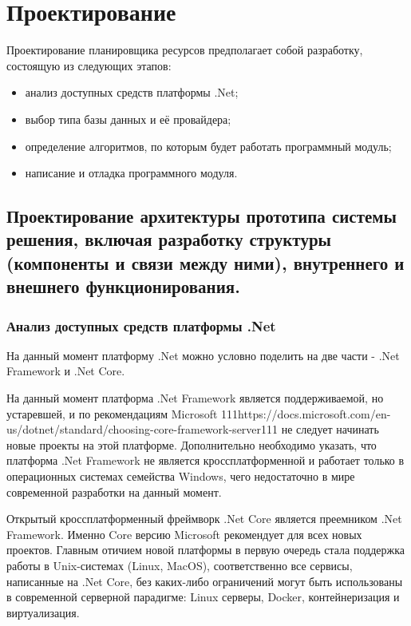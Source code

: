 \section{Проектирование}

Проектирование планировщика ресурсов предполагает собой разработку, состоящую из следующих этапов:
\begin{itemize}
	\item анализ доступных средств платформы .Net;
	\item выбор типа базы данных и её провайдера;
	\item определение алгоритмов, по которым будет работать программный модуль;
	\item написание и отладка программного модуля.
\end{itemize}


\subsection{Проектирование архитектуры прототипа системы решения, включая разработку структуры (компоненты и связи между ними), внутреннего и внешнего функционирования.}

\subsubsection{Анализ доступных средств платформы .Net}

На данный момент платформу .Net можно условно поделить на две части - .Net Framework и .Net Core.

На данный момент платформа .Net Framework является поддерживаемой, но устаревшей, и по рекомендациям Microsoft 111https://docs.microsoft.com/en-us/dotnet/standard/choosing-core-framework-server111 не следует начинать новые проекты на этой платформе. Дополнительно необходимо указать, что платформа .Net Framework не является кроссплатформенной и работает только в операционных системах семейства Windows, чего недостаточно в мире современной разработки на данный момент.

Открытый кроссплатформенный фреймворк .Net Core является преемником .Net Framework. Именно Core версию Microsoft рекомендует для всех новых проектов. Главным отичием новой платформы в первую очередь стала поддержка работы в Unix-системах (Linux, MacOS), соответственно все сервисы, написанные на .Net Core, без каких-либо ограничений могут быть использованы в современной серверной парадигме: Linux серверы, Docker, контейнеризация и виртуализация.


